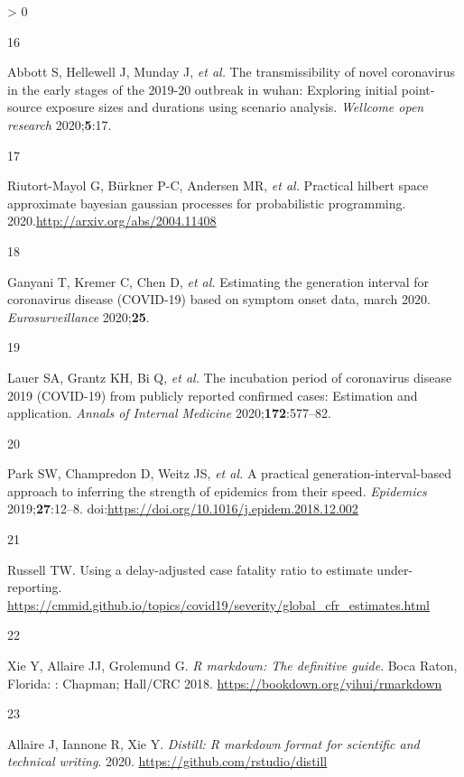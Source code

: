 \documentclass[
]{article}
\newlength{\cslhangindent}
\newlength{\csllabelwidth}
\newenvironment{CSLReferences}[2] %
 {%
  \setlength{\parindent}{0pt}
  \ifodd #1 \everypar{\setlength{\hangindent}{\cslhangindent}}\ignorespaces\fi
  \ifnum #2 > 0
  \setlength{\parskip}{#2\baselineskip}
  \fi
 }%
 {}
\newcommand{\CSLLeftMargin}[1]{\parbox[t]{\csllabelwidth}{#1}}
\newcommand{\CSLRightInline}[1]{\parbox[t]{\linewidth - \csllabelwidth}{#1}\break}
\begin{document}
\begin{CSLReferences}{0}{0}
\leavevmode\hypertarget{ref-Abbott:2020hj}{}%
\CSLLeftMargin{16 }
\CSLRightInline{Abbott S, Hellewell J, Munday J, \emph{et al.} The
transmissibility of novel coronavirus in the early stages of the 2019-20
outbreak in wuhan: Exploring initial point-source exposure sizes and
durations using scenario analysis. \emph{Wellcome open research}
2020;\textbf{5}:17.}

\leavevmode\hypertarget{ref-approxGP}{}%
\CSLLeftMargin{17 }
\CSLRightInline{Riutort-Mayol G, Bürkner P-C, Andersen MR, \emph{et al.}
Practical hilbert space approximate bayesian gaussian processes for
probabilistic programming. 2020.\url{http://arxiv.org/abs/2004.11408}}

\leavevmode\hypertarget{ref-generationinterval}{}%
\CSLLeftMargin{18 }
\CSLRightInline{Ganyani T, Kremer C, Chen D, \emph{et al.} Estimating
the generation interval for coronavirus disease (COVID-19) based on
symptom onset data, march 2020. \emph{Eurosurveillance}
2020;\textbf{25}.}

\leavevmode\hypertarget{ref-incubationperiod}{}%
\CSLLeftMargin{19 }
\CSLRightInline{Lauer SA, Grantz KH, Bi Q, \emph{et al.} The incubation
period of coronavirus disease 2019 (COVID-19) from publicly reported
confirmed cases: Estimation and application. \emph{Annals of Internal
Medicine} 2020;\textbf{172}:577--82.}

\leavevmode\hypertarget{ref-Park2019}{}%
\CSLLeftMargin{20 }
\CSLRightInline{Park SW, Champredon D, Weitz JS, \emph{et al.} A
practical generation-interval-based approach to inferring the strength
of epidemics from their speed. \emph{Epidemics} 2019;\textbf{27}:12--8.
doi:\url{https://doi.org/10.1016/j.epidem.2018.12.002}}

\leavevmode\hypertarget{ref-Russell:BFVkJ6lQ}{}%
\CSLLeftMargin{21 }
\CSLRightInline{Russell TW. Using a delay-adjusted case fatality ratio
to estimate under-reporting.
\url{https://cmmid.github.io/topics/covid19/severity/global_cfr_estimates.html}}

\leavevmode\hypertarget{ref-rmarkdown}{}%
\CSLLeftMargin{22 }
\CSLRightInline{Xie Y, Allaire JJ, Grolemund G. \emph{R markdown: The
definitive guide}. Boca Raton, Florida: : Chapman; Hall/CRC 2018.
\url{https://bookdown.org/yihui/rmarkdown}}

\leavevmode\hypertarget{ref-distill}{}%
\CSLLeftMargin{23 }
\CSLRightInline{Allaire J, Iannone R, Xie Y. \emph{Distill: R markdown
format for scientific and technical writing}. 2020.
\url{https://github.com/rstudio/distill}}


\end{CSLReferences}
\end{document}
